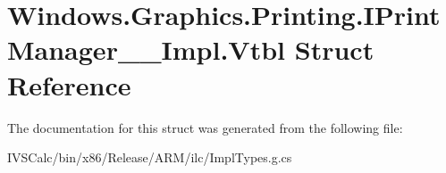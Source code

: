 \hypertarget{struct_windows_1_1_graphics_1_1_printing_1_1_i_print_manager_____impl_1_1_vtbl}{}\section{Windows.\+Graphics.\+Printing.\+I\+Print\+Manager\+\_\+\+\_\+\+Impl.\+Vtbl Struct Reference}
\label{struct_windows_1_1_graphics_1_1_printing_1_1_i_print_manager_____impl_1_1_vtbl}


The documentation for this struct was generated from the following file\+:\begin{DoxyCompactItemize}
\item 
I\+V\+S\+Calc/bin/x86/\+Release/\+A\+R\+M/ilc/Impl\+Types.\+g.\+cs\end{DoxyCompactItemize}
